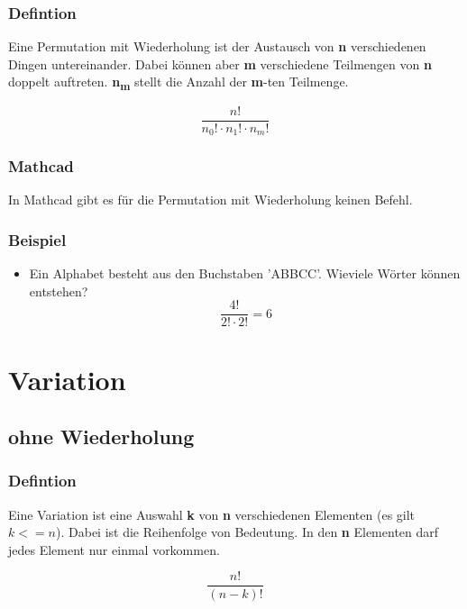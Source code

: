 \documentclass[a4paper,10pt]{article}
\begin{document}
\subsubsection{Defintion}
Eine Permutation mit Wiederholung ist der Austausch von \textbf{n}
verschiedenen Dingen untereinander. Dabei können aber \textbf{m} verschiedene
Teilmengen von \textbf{n} doppelt auftreten. \textbf{n\textsubscript{m}} stellt die
Anzahl der \textbf{m}-ten Teilmenge.

\begin{equation}
  \label{eq:2}
  \frac{n!}{n_0! \cdot n_1! \cdot n_m!}
\end{equation}

\subsubsection{Mathcad}
In Mathcad gibt es für die Permutation mit Wiederholung keinen Befehl.

\subsubsection{Beispiel}
\begin{itemize}
\item {
    Ein Alphabet besteht aus den Buchstaben 'ABBCC'. Wieviele Wörter
    können entstehen?
    \begin{equation}
      \label{eq:5}
      \frac{4!}{2! \cdot 2!} = 6
    \end{equation}
  }
\end{itemize}

\section{Variation}
\subsection{ohne Wiederholung}
\subsubsection{Defintion}
Eine Variation ist eine Auswahl \textbf{k} von \textbf{n} verschiedenen Elementen
(es gilt $ k <= n $). Dabei ist die Reihenfolge von Bedeutung. In den
\textbf{n} Elementen darf jedes Element nur einmal vorkommen.

\begin{equation}
  \label{eq:6}
  \frac{n!}{(n - k)!}
\end{equation}
\end{document}
